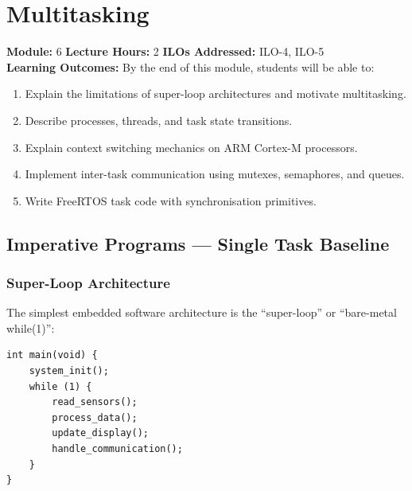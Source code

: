 
\chapter{Multitasking}
\label{ch:multitasking}

\begin{moduleinfo}
  \textbf{Module:} 6 \quad
  \textbf{Lecture Hours:} 2 \quad
  \textbf{ILOs Addressed:} ILO-4, ILO-5 \\[4pt]
  \textbf{Learning Outcomes:} By the end of this module, students will be able to:
  \begin{enumerate}[nosep]
    \item Explain the limitations of super-loop architectures and motivate multitasking.
    \item Describe processes, threads, and task state transitions.
    \item Explain context switching mechanics on ARM Cortex-M processors.
    \item Implement inter-task communication using mutexes, semaphores, and queues.
    \item Write FreeRTOS task code with synchronisation primitives.
  \end{enumerate}
\end{moduleinfo}

\section{Imperative Programs --- Single Task Baseline}
\label{sec:mt:superloop}

\subsection{Super-Loop Architecture}

The simplest embedded software architecture is the ``super-loop'' or ``bare-metal while(1)'':

\begin{lstlisting}[style=C, caption={Typical super-loop architecture.}]
int main(void) {
    system_init();
    while (1) {
        read_sensors();
        process_data();
        update_display();
        handle_communication();
    }
}
\end{lstlisting}

